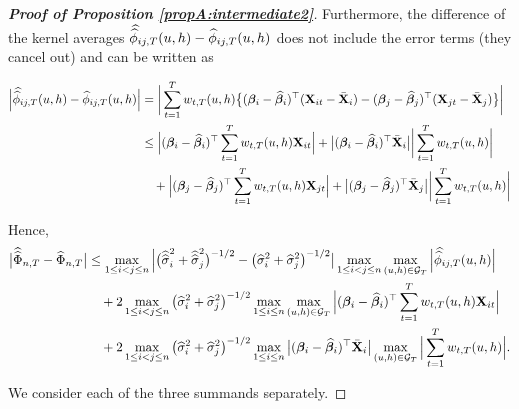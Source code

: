 \begin{proof}[\textnormal{\textbf{Proof of Proposition \ref{propA:intermediate2}}}]
Furthermore, the difference of the kernel averages $\doublehat{\phi}_{ij, T}(u,h) - \widehat{\phi}_{ij, T}(u,h) $ does not include the error terms (they cancel out) and can be written as
\begin{small}\begin{align*}
\Big| \doublehat{\phi}_{ij, T}(u,h) - \widehat{\phi}_{ij, T}(u,h) \Big|  &=\bigg| \sum_{t=1}^T w_{t,T}(u,h) \big\{ (\bfbeta_i - \widehat{\bfbeta}_i)^\top (\mathbf{X}_{it} - \bar{\mathbf{X}}_{i}) - (\bfbeta_j - \widehat{\bfbeta}_j)^\top (\mathbf{X}_{jt} - \bar{\mathbf{X}}_{j}) \big\} \bigg| \\
 &\le \Big|(\bfbeta_i - \widehat{\bfbeta}_i)^\top \sum_{t=1}^T w_{t,T}(u,h) \mathbf{X}_{it} \Big| +  \big|(\bfbeta_i - \widehat{\bfbeta}_i)^\top\bar{\mathbf{X}}_{i}\big| \bigg| \sum_{t=1}^T w_{t,T}(u,h)  \bigg| \\
&\quad +\Big|(\bfbeta_j - \widehat{\bfbeta}_j)^\top \sum_{t=1}^T w_{t,T}(u,h) \mathbf{X}_{jt}  \Big| + \big|(\bfbeta_j - \widehat{\bfbeta}_j)^\top\bar{\mathbf{X}}_{j}\big| \bigg| \sum_{t=1}^T w_{t,T}(u,h)  \bigg| 
\end{align*}
\end{small}

Hence,
\begin{align}\label{ineq-diff-1}
\begin{split}
\big| \doublehattwo{\Phi}_{n, T} - \widehat{\Phi}_{n, T} \big|& \le  \max_{1 \le i < j \le n} \Big|\big(\doublehattwo{\sigma}_i^2 + \doublehattwo{\sigma}_j^2 \big)^{-1/2} - \big(\widehat{\sigma}_i^2 + \widehat{\sigma}_j^2 \big)^{-1/2}\big|\max_{1 \le i< j \le n} \max_{(u,h) \in \mathcal{G}_T} \Big|\doublehat{\phi}_{ij,T}(u,h)\Big| \\
&\quad+ 2\max_{1\le i < j \le n} \big(\widehat{\sigma}_i^2+ \widehat{\sigma}_j^2 \big)^{-1/2} \max_{1 \le i \le n} \max_{(u,h) \in \mathcal{G}_T} \Big| (\bfbeta_i - \widehat{\bfbeta}_i)^\top\sum_{t=1}^T w_{t,T}(u,h) \mathbf{X}_{it} \Big| \\
&\quad+ 2\max_{1\le i < j \le n} \big(\widehat{\sigma}_i^2+ \widehat{\sigma}_j^2 \big)^{-1/2}\max_{1 \le i \le n}\big|(\bfbeta_i - \widehat{\bfbeta}_i)^\top\bar{\mathbf{X}}_{i}\big| \max_{(u,h) \in \mathcal{G}_T}  \Big| \sum_{t=1}^T w_{t,T}(u,h)  \Big|.
\end{split}
\end{align}

We consider each of the three summands separately.


\end{proof}
